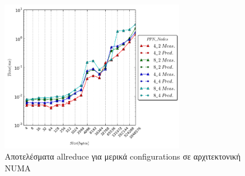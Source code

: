 \begin{figure}[ht]
    \centering
     \captionsetup{justification=centering,margin=0cm,font=footnotesize}
    \includegraphics[width=0.7\textwidth]{./images/allreduce_NUMA/allreduce.png}
    \caption{Αποτελέσματα allreduce για μερικά configurations σε αρχιτεκτονική NUMA}
    \label{fig:allreduce_conf_NUMA}
\end{figure}

